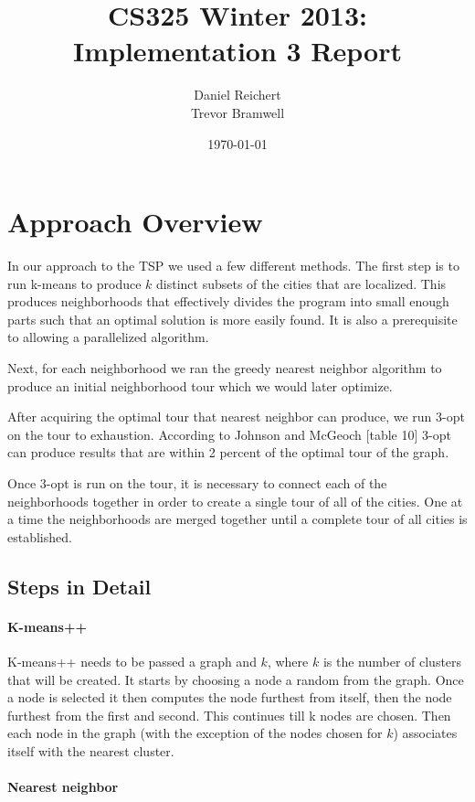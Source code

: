 \documentclass[12pt]{article}
\title{CS325 Winter 2013: Implementation 3 Report}
\author{
    Daniel Reichert \\
    Trevor Bramwell
}
\date{\today}
\begin{document}
\maketitle

\section*{Approach Overview}

In our approach to the TSP we used a few different methods.  The first step is
to run k-means to produce $k$ distinct subsets of the cities that are
localized.  This produces neighborhoods that effectively divides the program
into small enough parts such that an optimal solution is more easily found.  It
is also a prerequisite to allowing a parallelized algorithm.  

Next, for each neighborhood we ran the greedy nearest neighbor algorithm to
produce an initial neighborhood tour which we would later optimize.

After acquiring the optimal tour that nearest neighbor can produce, we run
3-opt on the tour to exhaustion. According to Johnson and McGeoch [table 10]
3-opt can produce results that are within 2 percent of the optimal tour of the
graph.

Once 3-opt is run on the tour, it is necessary to connect each of the
neighborhoods together in order to create a single tour of all of the cities.
One at a time the neighborhoods are merged together until a complete tour of
all cities is established.

\subsection*{Steps in Detail}

\paragraph{K-means++}

K-means++ needs to be passed a graph and $k$, where $k$ is the number of
clusters that will be created. It starts by choosing a node a random
from the graph. Once a node is selected it then computes the node
furthest from itself, then the node furthest from the first and second.
This continues till k nodes are chosen. Then each node in the graph
(with the exception of the nodes chosen for $k$) associates itself with
the nearest cluster.

\paragraph{Nearest neighbor}
\end{document}
